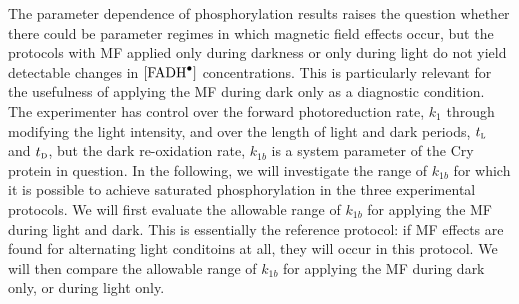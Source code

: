 \documentclass[twoside,twocolumn,9pt]{article}
\begin{document}
The parameter dependence of phosphorylation results raises the question whether there could be parameter regimes in which magnetic
field effects occur, but the protocols with MF applied only during darkness or only during light do not yield detectable changes in
$[\ce{FADH^{.}}]$ concentrations. This is particularly relevant for the usefulness of applying the MF during dark only as a
diagnostic condition. The experimenter has control over the forward photoreduction rate, $k_{1}$ through modifying the light
intensity, and over the length of light and dark periods, $t_{\textsc{l}}$ and $t_{\textsc{d}}$, but the dark re-oxidation rate,
$k_{1b}$ is a system parameter of the Cry protein in question. In the following, we will investigate the range of $k_{1b}$ for
which it is possible to achieve saturated phosphorylation in the three experimental protocols. We will first evaluate the allowable
range of $k_{1b}$ for applying the MF during light and dark. This is essentially the reference protocol: if MF effects are found
for alternating light conditoins at all, they will occur in this protocol. We will then compare the allowable range of $k_{1b}$ for
applying the MF during dark only, or during light only.
\end{document}
